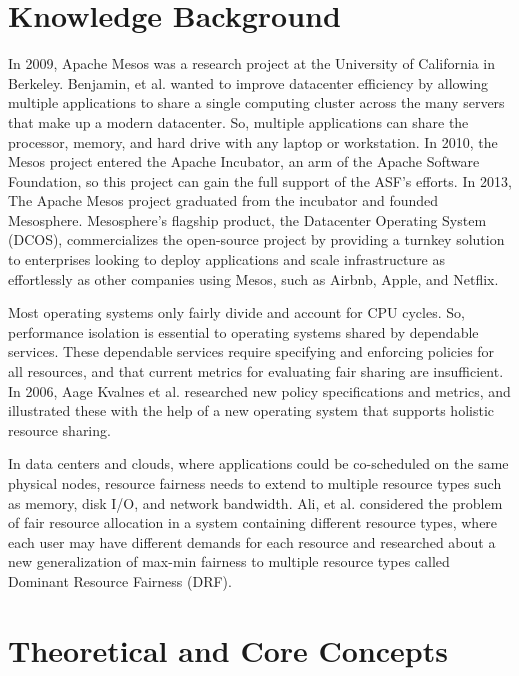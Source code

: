 \documentclass[12pt,oneside,openright,a4paper]{cpe-english-project}
\begin{document}
\section{Knowledge Background}
\hspace{10mm}In 2009, Apache Mesos \cite{mesos} was a research project at the University of California in Berkeley.  Benjamin, et al. wanted to improve datacenter efficiency by allowing multiple applications to share a single computing cluster across the many servers that make up a modern datacenter.  So, multiple applications can share the processor, memory, and hard drive with any laptop or workstation.  In 2010, the Mesos project entered the Apache Incubator, an arm of the Apache Software Foundation, so this project can gain the full support of the ASF’s efforts.  In 2013, The Apache Mesos project graduated from the incubator and founded Mesosphere.  Mesosphere’s flagship product, the Datacenter Operating System (DCOS), commercializes the open-source project by providing a turnkey solution to enterprises looking to deploy applications and scale infrastructure as effortlessly as other companies using Mesos, such as Airbnb, Apple, and Netflix. 

\hspace{10mm}Most operating systems only fairly divide and account for CPU cycles.  So, performance isolation is essential to operating systems shared by dependable services.  These dependable services require specifying and enforcing policies for all resources, and that current metrics for evaluating fair sharing are insufficient. In 2006, Aage Kvalnes et al. researched new policy specifications and metrics, and illustrated these with the help of a new operating system that supports holistic resource sharing.  \cite{policiesAndMetrics}

\hspace{10mm}In data centers and clouds, where applications could be co-scheduled on the same physical nodes, resource fairness needs to extend to multiple resource types such as memory, disk I/O, and network bandwidth.  Ali, et al. considered the problem of fair resource allocation in a system containing different resource types, where each user may have different demands for each resource and researched about a new generalization of max-min fairness to multiple resource types called Dominant Resource Fairness (DRF). \cite{dominantResourceFairness}

\section{Theoretical and Core Concepts}
\end{document}
